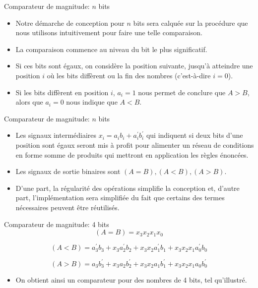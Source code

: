 \documentclass[presentation]{beamer}
\begin{document}
\begin{frame}[label={sec:orgd3e233d}]{Comparateur de magnitude: \(n\) bits}
\begin{itemize}
\item Notre démarche de conception pour \(n\) bits sera calquée sur la procédure que nous utilisons intuitivement pour faire une telle comparaison.

\item La comparaison commence au niveau du bit le plus significatif.

\item Si ces bits sont égaux, on considère la position suivante, jusqu'à atteindre une position \(i\) où les bits diffèrent ou la fin des nombres (c'est-à-dire \(i=0\)).

\item Si les bits diffèrent en position \(i\), \(a_i = 1\) nous permet de conclure que \(A > B\), alors que \(a_i = 0\) nous indique que \(A < B\).
\end{itemize}
\end{frame}

\begin{frame}[label={sec:org7e7fa8b}]{Comparateur de magnitude: \(n\) bits}
\begin{itemize}
\item Les signaux intermédiaires \(x_i = a_i b_i + a_i^\prime b_i^\prime\) qui indiquent si deux bits d'une position sont égaux seront mis à profit pour alimenter un réseau de conditions en forme somme de produits qui mettront en application les règles énoncées.

\item Les signaux de sortie binaires sont \((A = B), (A < B), (A > B)\).

\item D'une part, la régularité des opérations simplifie la conception et, d'autre part, l'implémentation sera simplifiée du fait que certains des termes nécessaires peuvent être réutilisés.
\end{itemize}
\end{frame}

\begin{frame}[label={sec:org543738d}]{Comparateur de magnitude: 4 bits}
$$ (A = B) = x_3 x_2 x_1 x_0 $$ 

$$ (A < B) = a_3^\prime b_3 + x_3  a_2^\prime b_2  +  x_3 x_2  a_1^\prime b_1 +  x_3 x_2 x_1  a_0^\prime b_0 $$

$$ (A > B) = a_3 b_3^\prime + x_3  a_2 b_2^\prime  +  x_3 x_2  a_1 b_1^\prime +  x_3 x_2 x_1  a_0 b_0^\prime $$

\begin{itemize}
\item On obtient ainsi un comparateur pour des nombres de 4 bits, tel qu'illustré.
\end{itemize}
\end{frame}
\end{document}
